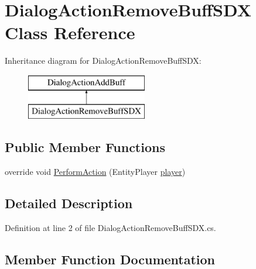 \hypertarget{class_dialog_action_remove_buff_s_d_x}{}\section{Dialog\+Action\+Remove\+Buff\+S\+DX Class Reference}
\label{class_dialog_action_remove_buff_s_d_x}
Inheritance diagram for Dialog\+Action\+Remove\+Buff\+S\+DX\+:\begin{figure}[H]
\begin{center}
\leavevmode
\includegraphics[height=2.000000cm]{d7/db9/class_dialog_action_remove_buff_s_d_x}
\end{center}
\end{figure}
\subsection*{Public Member Functions}
\begin{DoxyCompactItemize}
\item 
override void \mbox{\hyperlink{class_dialog_action_remove_buff_s_d_x_a383365dc78f3bfee958a5d1927949edf}{Perform\+Action}} (Entity\+Player \mbox{\hyperlink{_sphere_i_i_01_music_01_boxes_2_config_2_localization_8txt_a4e2cb8aeff651600ea1cc57fe5a929a4}{player}})
\end{DoxyCompactItemize}


\subsection{Detailed Description}


Definition at line 2 of file Dialog\+Action\+Remove\+Buff\+S\+D\+X.\+cs.



\subsection{Member Function Documentation}
\mbox{\label{class_dialog_action_remove_buff_s_d_x_a383365dc78f3bfee958a5d1927949edf}} 
